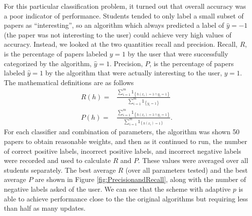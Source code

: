 \documentclass[12pt]{article}
\begin{document}
For this particular classification problem, it turned out that overall accuracy was a poor indicator of performance.  Students tended to only label a small subset of papers as ``interesting'', so an algorithm which always predicted a label of $\hat{y} = -1$ (the paper was not interesting to the user) could achieve very high values of accuracy.  Instead, we looked at the two quantities recall and precision.  Recall, $R$, is the percentage of papers labeled $y=1$ by the user that were successfully categorized by the algorithm, $\hat{y} = 1$.  Precision, $P$, is the percentage of papers labeled $\hat{y} = 1$ by the algorithm that were actually interesting to the user, $y = 1$.  The mathematical definitions are as follows 
\begin{align*}
R(h) = & \frac{\sum_{i=1}^m 1_{\left\{h(x_i) = 1 \cap y_i =1\right\}}}{\sum_{i=1}^m 1_{\left\{y_i = 1\right\}}} \\
P(h) = & \frac{\sum_{i=1}^m 1_{\left\{h(x_i) = 1 \cap y_i =1\right\}}}{\sum_{i=1}^m 1_{\left\{h(x_i) = 1\right\}}}.
\end{align*}
For each classifier and combination of parameters, the algorithm was shown 50 papers to obtain reasonable weights, and then as it continued to run, the number of correct positive labels, incorrect positive labels, and incorrect negative labels were recorded and used to calculate $R$ and $P$.  These values were averaged over all students separately. The best average $R$ (over all parameters tested) and the best average $P$ are shown in Figure \ref{fig:PrecisionandRecall}, along with the number of negative labels asked of the user.  We can see that the scheme with adaptive $p$ is able to achieve performance close to the the original algorithms but requiring less than half as many updates.
\end{document}
